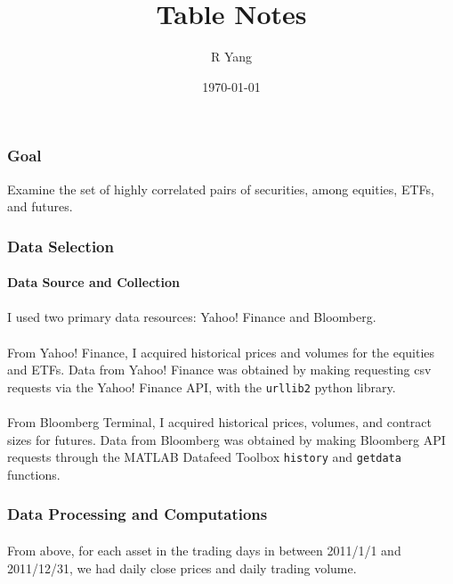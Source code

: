 \documentclass[11pt]{article}
\title{\textbf{Table Notes}}
\author{R Yang}
\date{\today}
\begin{document}
\maketitle

\subsubsection{Goal}
Examine the set of highly correlated pairs of securities, among equities, ETFs, and futures.

\subsubsection{Data Selection}

\paragraph{Data Source and Collection}
\paragraph{}
I used two primary data resources: Yahoo! Finance and Bloomberg. 

\paragraph{}
From Yahoo! Finance, I acquired historical prices and volumes for the equities and ETFs. Data from Yahoo! Finance was obtained by making requesting csv requests via the Yahoo! Finance API, with the \texttt{urllib2} python library.

\paragraph{}
From Bloomberg Terminal, I acquired historical prices, volumes, and contract sizes for  futures. Data from Bloomberg was obtained by making Bloomberg API requests through the MATLAB Datafeed Toolbox \texttt{history} and \texttt{getdata} functions.

\subsubsection{Data Processing and Computations}

\paragraph{}
From above, for each asset in the trading days in between 2011/1/1 and 2011/12/31, we had daily close prices and daily trading volume.
\end{document}
